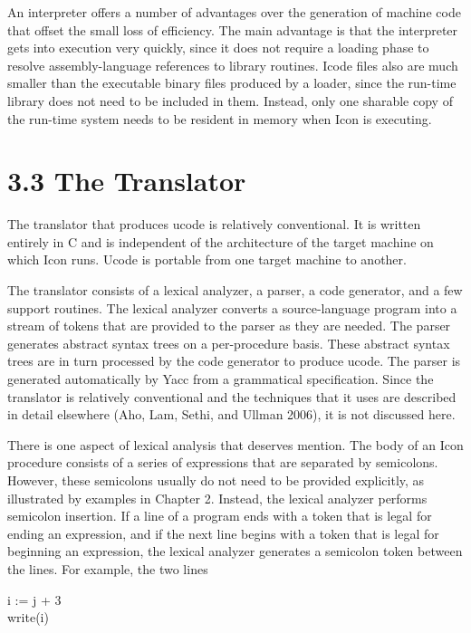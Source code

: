 An interpreter offers a number of advantages over the generation of
machine code that offset the small loss of efficiency. The main
advantage is that the interpreter gets into execution very quickly,
since it does not require a loading phase to resolve assembly-language
references to library routines. Icode files also are much smaller than
the executable binary files produced by a loader, since the run-time
library does not need to be included in them. Instead, only one
sharable copy of the run-time system needs to be resident in memory
when Icon is executing.


\section[3.3 The Translator]{3.3 The Translator}

The translator that produces ucode is relatively conventional. It is
written entirely in C and is independent of the architecture of the
target machine on which Icon runs. Ucode is portable from one target
machine to another.

The translator consists of a lexical analyzer, a parser, a code
generator, and a few support routines. The lexical analyzer converts a
source-language program into a stream of tokens that are provided to
the parser as they are needed.  The parser generates abstract syntax
trees on a per-procedure basis. These abstract syntax trees are in
turn processed by the code generator to produce ucode. The parser is
generated automatically by Yacc from a grammatical specification.
Since the translator is relatively conventional and the techniques
that it uses are described in detail elsewhere (Aho, Lam, Sethi, and
Ullman 2006), it is not discussed here.

There is one aspect of lexical analysis that deserves mention. The
body of an Icon procedure consists of a series of expressions that are
separated by semicolons. However, these semicolons usually do not need
to be provided explicitly, as illustrated by examples in Chapter
2. Instead, the lexical analyzer performs semicolon insertion. If a
line of a program ends with a token that is legal for ending an
expression, and if the next line begins with a token that is legal for
beginning an expression, the lexical analyzer generates a semicolon
token between the lines. For example, the two lines

\begin{iconcode}
\>i := j\textit{ }+ 3\\
\>write(i)
\end{iconcode}

